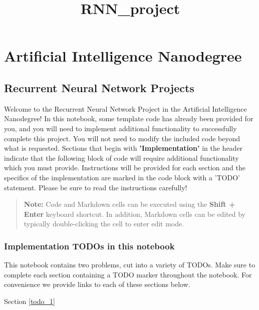 \documentclass[11pt]{article}
\title{RNN\_project}
\begin{document}
    
    
    \maketitle
    
    

    
    \section{Artificial Intelligence
Nanodegree}\label{artificial-intelligence-nanodegree}

\subsection{Recurrent Neural Network
Projects}\label{recurrent-neural-network-projects}

Welcome to the Recurrent Neural Network Project in the Artificial
Intelligence Nanodegree! In this notebook, some template code has
already been provided for you, and you will need to implement additional
functionality to successfully complete this project. You will not need
to modify the included code beyond what is requested. Sections that
begin with \textbf{'Implementation'} in the header indicate that the
following block of code will require additional functionality which you
must provide. Instructions will be provided for each section and the
specifics of the implementation are marked in the code block with a
'TODO' statement. Please be sure to read the instructions carefully!

\begin{quote}
\textbf{Note:} Code and Markdown cells can be executed using the
\textbf{Shift + Enter} keyboard shortcut. In addition, Markdown cells
can be edited by typically double-clicking the cell to enter edit mode.
\end{quote}

    \subsubsection{Implementation TODOs in this
notebook}\label{implementation-todos-in-this-notebook}

This notebook contains two problems, cut into a variety of TODOs. Make
sure to complete each section containing a TODO marker throughout the
notebook. For convenience we provide links to each of these sections
below.

Section \ref{todo_1}
\end{document}
